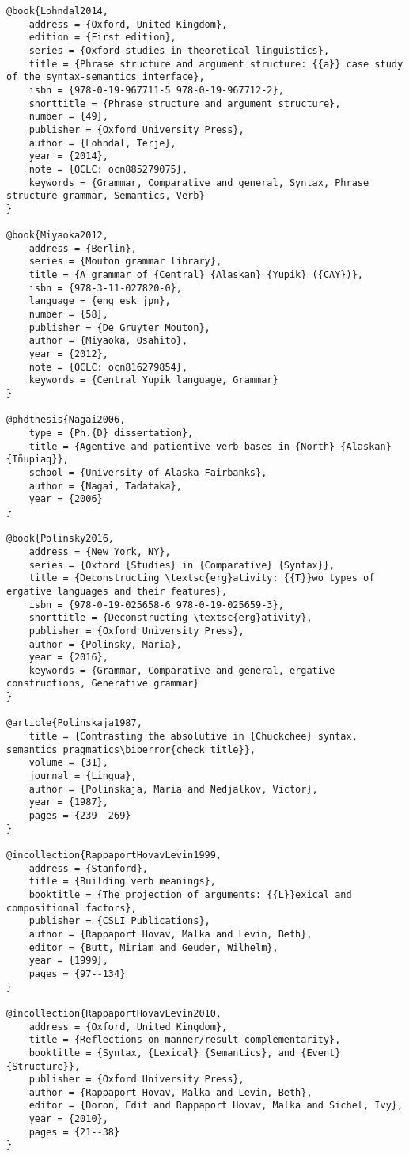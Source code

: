 \documentclass[output=paper,modfonts,nonflat,newtxmath]{langsci/langscibook}
\begin{document}
\begin{verbatim}
@book{Lohndal2014,
	address = {Oxford, United Kingdom},
	edition = {First edition},
	series = {Oxford studies in theoretical linguistics},
	title = {Phrase structure and argument structure: {{a}} case study of the syntax-semantics interface},
	isbn = {978-0-19-967711-5 978-0-19-967712-2},
	shorttitle = {Phrase structure and argument structure},
	number = {49},
	publisher = {Oxford University Press},
	author = {Lohndal, Terje},
	year = {2014},
	note = {OCLC: ocn885279075},
	keywords = {Grammar, Comparative and general, Syntax, Phrase structure grammar, Semantics, Verb}
}

@book{Miyaoka2012,
	address = {Berlin},
	series = {Mouton grammar library},
	title = {A grammar of {Central} {Alaskan} {Yupik} ({CAY})},
	isbn = {978-3-11-027820-0},
	language = {eng esk jpn},
	number = {58},
	publisher = {De Gruyter Mouton},
	author = {Miyaoka, Osahito},
	year = {2012},
	note = {OCLC: ocn816279854},
	keywords = {Central Yupik language, Grammar}
}

@phdthesis{Nagai2006,
	type = {Ph.{D} dissertation},
	title = {Agentive and patientive verb bases in {North} {Alaskan} {Iñupiaq}},
	school = {University of Alaska Fairbanks},
	author = {Nagai, Tadataka},
	year = {2006}
}

@book{Polinsky2016,
	address = {New York, NY},
	series = {Oxford {Studies} in {Comparative} {Syntax}},
	title = {Deconstructing \textsc{erg}ativity: {{T}}wo types of ergative languages and their features},
	isbn = {978-0-19-025658-6 978-0-19-025659-3},
	shorttitle = {Deconstructing \textsc{erg}ativity},
	publisher = {Oxford University Press},
	author = {Polinsky, Maria},
	year = {2016},
	keywords = {Grammar, Comparative and general, ergative constructions, Generative grammar}
}

@article{Polinskaja1987,
	title = {Contrasting the absolutive in {Chuckchee} syntax, semantics pragmatics\biberror{check title}},
	volume = {31},
	journal = {Lingua},
	author = {Polinskaja, Maria and Nedjalkov, Victor},
	year = {1987},
	pages = {239--269}
}

@incollection{RappaportHovavLevin1999,
	address = {Stanford},
	title = {Building verb meanings},
	booktitle = {The projection of arguments: {{L}}exical and compositional factors},
	publisher = {CSLI Publications},
	author = {Rappaport Hovav, Malka and Levin, Beth},
	editor = {Butt, Miriam and Geuder, Wilhelm},
	year = {1999},
	pages = {97--134}
}

@incollection{RappaportHovavLevin2010,
	address = {Oxford, United Kingdom},
	title = {Reflections on manner/result complementarity},
	booktitle = {Syntax, {Lexical} {Semantics}, and {Event} {Structure}},
	publisher = {Oxford University Press},
	author = {Rappaport Hovav, Malka and Levin, Beth},
	editor = {Doron, Edit and Rappaport Hovav, Malka and Sichel, Ivy},
	year = {2010},
	pages = {21--38}
}


\end{verbatim}
\end{document}
